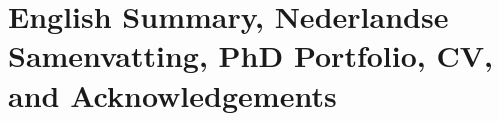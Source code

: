 \backmatter
\chapter[English Summary, Nederlandse Samenvatting, PhD Portfolio, CV, and Acknowledgements][]{English Summary, Nederlandse Samenvatting, PhD Portfolio, CV, and Acknowledgements}
\cleardoublepage


\clearpage

\clearpage

\clearpage

\clearpage
%
